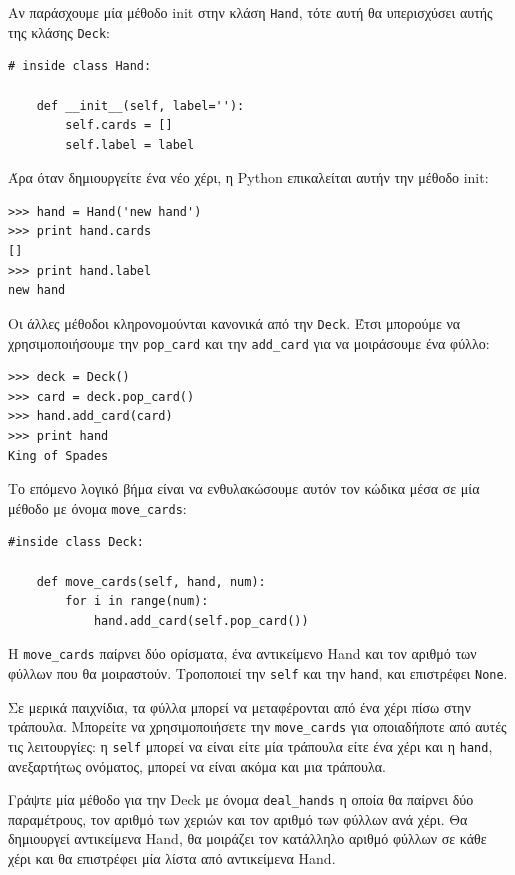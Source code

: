 \documentclass[10pt]{book}
\begin{document}
Αν παράσχουμε μία μέθοδο init στην κλάση {\tt Hand}, τότε αυτή θα υπερισχύσει 
αυτής της κλάσης {\tt Deck}:

\begin{verbatim}
# inside class Hand:

    def __init__(self, label=''):
        self.cards = []
        self.label = label
\end{verbatim}
%
Άρα όταν δημιουργείτε ένα νέο χέρι, η Python επικαλείται αυτήν την μέθοδο init:

\begin{verbatim}
>>> hand = Hand('new hand')
>>> print hand.cards
[]
>>> print hand.label
new hand
\end{verbatim}
%
Οι άλλες μέθοδοι κληρονομούνται κανονικά από την {\tt Deck}. Έτσι μπορούμε
να χρησιμοποιήσουμε την \verb"pop_card" και την \verb"add_card" για να μοιράσουμε ένα φύλλο:

\begin{verbatim}
>>> deck = Deck()
>>> card = deck.pop_card()
>>> hand.add_card(card)
>>> print hand
King of Spades
\end{verbatim}
%
Το επόμενο λογικό βήμα είναι να ενθυλακώσουμε αυτόν τον κώδικα μέσα σε μία μέθοδο
με όνομα \verb"move_cards":

\begin{verbatim}
#inside class Deck:

    def move_cards(self, hand, num):
        for i in range(num):
            hand.add_card(self.pop_card())
\end{verbatim}
%
Η \verb"move_cards" παίρνει δύο ορίσματα, ένα αντικείμενο Hand
και τον αριθμό των φύλλων που θα μοιραστούν. Τροποποιεί την {\tt self} και την
{\tt hand}, και επιστρέφει {\tt None}.

Σε μερικά παιχνίδια, τα φύλλα μπορεί να μεταφέρονται από ένα χέρι πίσω στην τράπουλα.  
Μπορείτε να χρησιμοποιήσετε την \verb"move_cards" για οποιαδήποτε από αυτές
τις λειτουργίες: η {\tt self} μπορεί να είναι είτε μία τράπουλα είτε 
ένα χέρι και η {\tt hand}, ανεξαρτήτως ονόματος, μπορεί να είναι ακόμα και μια τράπουλα.
\\

\begin{exercise}

Γράψτε μία μέθοδο για την Deck με όνομα \verb"deal_hands" η οποία 
θα παίρνει δύο παραμέτρους, τον αριθμό των χεριών και τον αριθμό των φύλλων ανά χέρι.
Θα δημιουργεί αντικείμενα Hand, θα μοιράζει τον κατάλληλο αριθμό φύλλων σε 
κάθε χέρι και θα επιστρέφει μία λίστα από αντικείμενα Hand.

\end{exercise}
\end{document}
